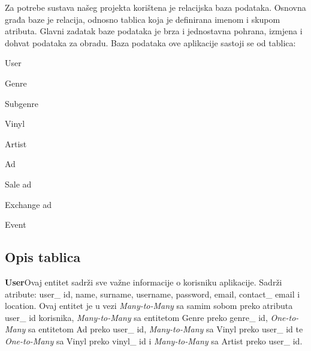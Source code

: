 \quad Za potrebe sustava našeg projekta korištena je relacijska baza podataka. Osnovna građa baze je relacija, odnosno tablica koja je definirana imenom i skupom atributa. Glavni zadatak baze podataka je brza i jednostavna pohrana, izmjena i dohvat podataka za obradu. Baza podataka ove aplikacije sastoji se od tablica:
			
			\begin{packed_item}
				\item User
				\item Genre
				\item Subgenre
				\item Vinyl
				\item Artist
				\item Ad
				\item Sale ad
				\item Exchange ad
				\item Event
			\end{packed_item}
		
			\subsection{Opis tablica}
			
%
				
\quad\textbf{User}\quad Ovaj entitet sadrži sve važne informacije o korisniku aplikacije. Sadrži atribute: user\_ id, name, surname, username, password, email, contact\_ email i location. Ovaj entitet je u vezi \textit{Many-to-Many} sa samim sobom preko atributa user\_ id korisnika, \textit{Many-to-Many} sa entitetom Genre preko genre\_ id, \textit{One-to-Many} sa entitetom Ad preko user\_ id, \textit{Many-to-Many} sa Vinyl preko user\_ id te \textit{One-to-Many} sa Vinyl preko vinyl\_ id i \textit{Many-to-Many} sa Artist preko user\_ id.
				
